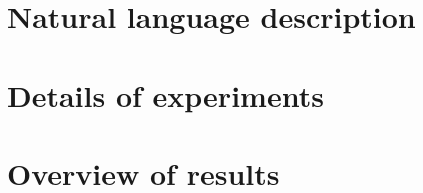 \documentclass[11pt]{article} %
\begin{document}
\section{Natural language description}

\section{Details of experiments}

\section{Overview of results}
\end{document}

